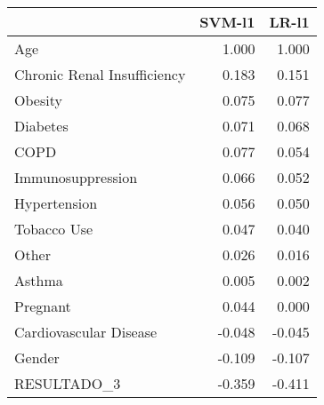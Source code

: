 \begin{tabular}{lrr}
\toprule
{} &  SVM-l1 &  LR-l1 \\
\midrule
Age                         &   1.000 &  1.000 \\
Chronic Renal Insufficiency &   0.183 &  0.151 \\
Obesity                     &   0.075 &  0.077 \\
Diabetes                    &   0.071 &  0.068 \\
COPD                        &   0.077 &  0.054 \\
Immunosuppression           &   0.066 &  0.052 \\
Hypertension                &   0.056 &  0.050 \\
Tobacco Use                 &   0.047 &  0.040 \\
Other                       &   0.026 &  0.016 \\
Asthma                      &   0.005 &  0.002 \\
Pregnant                    &   0.044 &  0.000 \\
Cardiovascular Disease      &  -0.048 & -0.045 \\
Gender                      &  -0.109 & -0.107 \\
RESULTADO\_3                 &  -0.359 & -0.411 \\
\bottomrule
\end{tabular}
